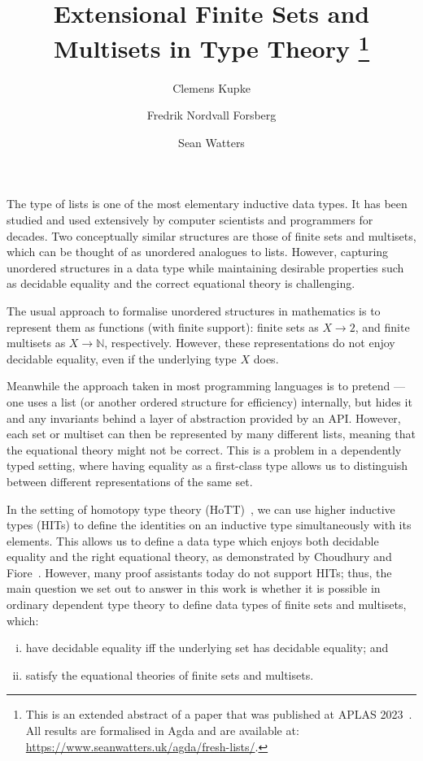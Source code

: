 \documentclass[a4paper]{easychair}
\title{Extensional Finite Sets and Multisets in Type Theory
\footnote{
This is an extended abstract of a paper that was published at APLAS 2023~\cite{freshlists}.
All results are formalised in Agda and are available at:
\url{https://www.seanwatters.uk/agda/fresh-lists/}.
}}
\author{
Clemens Kupke
\and
Fredrik Nordvall Forsberg
\and
Sean Watters
}
\institute{
  University of Strathclyde, UK\\
  \email{\{clemens.kupke, fredrik.nordvall-forsberg, sean.watters\}@strath.ac.uk}
 }
\begin{document}
\maketitle



The type of lists is one of the most elementary inductive data types.
It has been studied and used extensively by computer scientists and programmers for decades.
Two conceptually similar structures are those of finite sets and multisets, which can be thought of as unordered analogues to lists.
However, capturing unordered structures in a data type while maintaining desirable properties such as decidable equality and the correct equational theory is challenging.

The usual approach to formalise unordered structures in mathematics
is to represent them as functions (with finite support): finite sets as $X \to 2$, and finite multisets as $X \to \mathbb{N}$, respectively.
However, these representations do not enjoy decidable equality, even if the underlying type $X$ does.

Meanwhile the approach taken in most programming languages is to pretend --- one uses a list (or another ordered structure for efficiency) internally, but hides it and any invariants behind a layer of abstraction provided by an API.
However, each set or multiset can then be represented by many different lists,
meaning that the equational theory might not be correct. This is a problem
in a dependently typed setting, where
having equality as a first-class type allows us to
distinguish between different representations of the same set.


In the setting of homotopy type theory (HoTT)~\cite{hottbook}, we can use higher inductive types (HITs) to define the identities on an inductive type simultaneously with its elements.
This allows us to define a data type which enjoys both decidable equality and the right equational theory, as demonstrated by Choudhury and Fiore~\cite{choudhuryfiore2023freecommmon}.
However, many proof assistants today do not support HITs;
thus, the main question we set out to answer in this work is
whether it is possible in ordinary dependent type theory
to define data types of finite sets and multisets, which:
\begin{enumerate}[(i)]
  \item have decidable equality iff the underlying set has decidable equality; and\label{item:success1}
  \item satisfy the equational theories of finite sets and multisets.\label{item:success2}
\end{enumerate}
\end{document}
